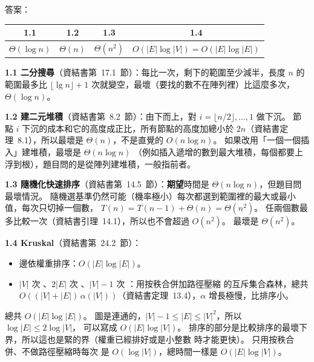 \begin{pastsoln}
答案：
\begin{center}
\begin{tabular}{cccc}
\toprule
1.1 & 1.2 & 1.3 & 1.4 \\
\midrule
$\Theta(\log n)$ & $\Theta(n)$ & $\Theta(n^2)$ & $O(|E| \log |V|) = O(|E| \log |E|)$ \\
\bottomrule
\end{tabular}
\end{center}

\textbf{1.1 二分搜尋}（資結書第~17.1~節）：每比一次，剩下的範圍至少減半，長度 $n$ 的範圍最多比
$\lfloor \lg n \rfloor + 1$ 次就變空，最壞（要找的數不在陣列裡）比這麼多次，$\Theta(\log n)$。

\textbf{1.2 建二元堆積}（資結書第~8.2~節）：由下而上，對 $i = \lfloor n/2 \rfloor, \ldots, 1$ 做下沉。
節點 $i$ 下沉的成本和它的高度成正比，所有節點的高度加總小於 $2n$（資結書定理~8.1），所以最壞是
$\Theta(n)$，不是直覺的 $O(n \log n)$。 如果改用「一個一個插入」建堆積，最壞是 $\Theta(n \log n)$
（例如插入遞增的數到最大堆積，每個都要上浮到根），題目問的是從陣列建堆積，一般指前者。

\textbf{1.3 隨機化快速排序}（資結書第~14.5~節）：\textbf{期望}時間是 $\Theta(n \log n)$，但題目問最壞情況。
隨機選基準仍然可能（機率極小）每次都選到範圍裡的最大或最小值，每次只切掉一個數，
$T(n) = T(n-1) + \Theta(n) = \Theta(n^2)$。 任兩個數最多比較一次（資結書引理~14.1），所以也不會超過
$O(n^2)$。 最壞是 $\Theta(n^2)$。

\textbf{1.4 Kruskal}（資結書第~24.2~節）：
\begin{itemize}
\item 邊依權重排序：$O(|E| \log |E|)$。
\item $|V|$ 次 、$2|E|$ 次 、$|V| - 1$ 次 ：用按秩合併加路徑壓縮
的互斥集合森林，總共 $O((|V| + |E|)\,\alpha(|V|))$（資結書定理~13.4），$\alpha$ 增長極慢，比排序小。
\end{itemize}
總共 $O(|E| \log |E|)$。 圖是連通的，$|V| - 1 \le |E| \le |V|^2$，所以 $\log |E| \le 2 \log |V|$，
可以寫成 $O(|E| \log |V|)$。 排序的部分是比較排序的最壞下界，所以這也是緊的界（權重已經排好或是小整數
時才能更快）。 只用按秩合併、不做路徑壓縮時每次  是 $O(\log |V|)$，總時間一樣是
$O(|E| \log |V|)$。
\end{pastsoln}

